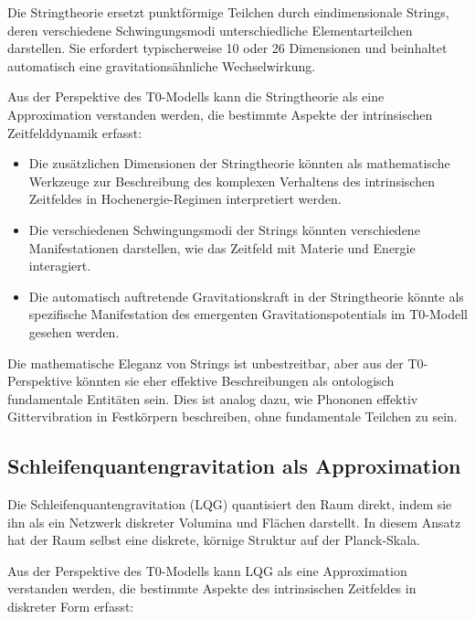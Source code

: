 \documentclass[12pt,a4paper]{article}
\begin{document}
	Die Stringtheorie ersetzt punktförmige Teilchen durch eindimensionale Strings, deren verschiedene Schwingungsmodi unterschiedliche Elementarteilchen darstellen. Sie erfordert typischerweise 10 oder 26 Dimensionen und beinhaltet automatisch eine gravitationsähnliche Wechselwirkung.
	
	Aus der Perspektive des T0-Modells kann die Stringtheorie als eine Approximation verstanden werden, die bestimmte Aspekte der intrinsischen Zeitfelddynamik erfasst:
	
	\begin{itemize}
		\item Die zusätzlichen Dimensionen der Stringtheorie könnten als mathematische Werkzeuge zur Beschreibung des komplexen Verhaltens des intrinsischen Zeitfeldes in Hochenergie-Regimen interpretiert werden.
		
		\item Die verschiedenen Schwingungsmodi der Strings könnten verschiedene Manifestationen darstellen, wie das Zeitfeld mit Materie und Energie interagiert.
		
		\item Die automatisch auftretende Gravitationskraft in der Stringtheorie könnte als spezifische Manifestation des emergenten Gravitationspotentials im T0-Modell gesehen werden.
	\end{itemize}
	
	Die mathematische Eleganz von Strings ist unbestreitbar, aber aus der T0-Perspektive könnten sie eher effektive Beschreibungen als ontologisch fundamentale Entitäten sein. Dies ist analog dazu, wie Phononen effektiv Gittervibration in Festkörpern beschreiben, ohne fundamentale Teilchen zu sein.
	
	\subsection{Schleifenquantengravitation als Approximation}
	\label{subsec:lqg}
	
	Die Schleifenquantengravitation (LQG) quantisiert den Raum direkt, indem sie ihn als ein Netzwerk diskreter Volumina und Flächen darstellt. In diesem Ansatz hat der Raum selbst eine diskrete, körnige Struktur auf der Planck-Skala.
	
	Aus der Perspektive des T0-Modells kann LQG als eine Approximation verstanden werden, die bestimmte Aspekte des intrinsischen Zeitfeldes in diskreter Form erfasst:
	
\end{document}

